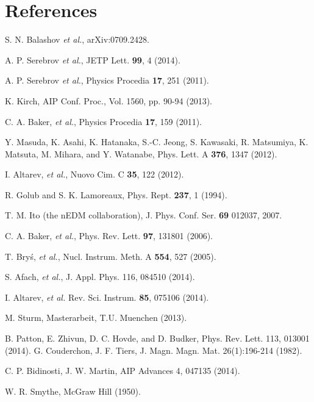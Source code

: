 \documentclass[review]{elsarticle}
\begin{document}
\section*{References}


\begin{thebibliography}{00}

 S. N. Balashov {\it et al.}, arXiv:0709.2428.

 A. P. Serebrov {\it et al.}, JETP Lett. {\bf 99}, 4
  (2014).

 A. P. Serebrov {\it et al.}, Physics Procedia {\bf
  17}, 251 (2011).

 K. Kirch, AIP Conf. Proc., Vol. 1560, pp. 90-94
  (2013).

 C. A. Baker, {\it et al.}, Physics Procedia {\bf
  17}, 159 (2011).

 Y. Masuda, K. Asahi, K. Hatanaka, S.-C. Jeong,
  S. Kawasaki, R. Matsumiya, K. Matsuta, M. Mihara, and Y. Watanabe,
  Phys. Lett. A {\bf 376}, 1347 (2012).

 I. Altarev, {\it et al.}, Nuovo Cim. C {\bf
  35}, 122 (2012).

 R. Golub and S. K. Lamoreaux, Phys. Rept.  {\bf
  237}, 1 (1994).

 T. M. Ito (the nEDM collaboration),
  J. Phys. Conf. Ser. {\bf 69} 012037, 2007.

 C. A. Baker, {\it et al.}, Phys. Rev. Lett. {\bf
  97}, 131801 (2006).

 T. Bry\'s, {\it et al.}, Nucl. Instrum. Meth. A
  {\bf 554}, 527 (2005).

 S. Afach, {\it et al.}, J. Appl. Phys. 116, 084510 (2014).

 I. Altarev, {\it et al.}
  Rev. Sci. Instrum. {\bf 85}, 075106 (2014).

 M. Sturm, Masterarbeit, T.U. Muenchen (2013).

 B. Patton, E. Zhivun, D. C. Hovde, and D. Budker,
  Phys. Rev. Lett. 113, 013001 (2014).
 G. Couderchon, J. F. Tiers, J. Magn. Magn. Mat. 26(1):196-214 (1982).

 C. P. Bidinosti, J. W. Martin, AIP Advances 4, 047135 (2014).

 W. R. Smythe, McGraw Hill (1950).


\end{thebibliography}
\end{document}

